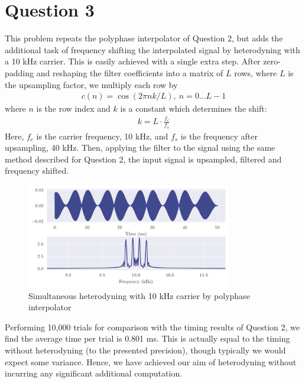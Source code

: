 \section*{Question 3}

This problem repeats the polyphase interpolator of Question 2, but adds the additional task of frequency shifting the interpolated signal by heterodyning with a 10 kHz carrier. This is easily achieved with a single extra step. After zero-padding and reshaping the filter coefficients into a matrix of $L$ rows, where $L$ is the upsampling factor, we multiply each row by
\begin{align}
    c(n) = \cos(2\pi nk/L),\ n = 0 \dots L-1
\end{align}
where $n$ is the row index and $k$ is a constant which determines the shift:
\begin{align}
    k = L \cdot \frac{f_c}{f_s}
\end{align}
Here, $f_c$ is the carrier frequency, 10 kHz, and $f_s$ is the frequency after upsampling, 40 kHz. Then, applying the filter to the signal using the same method described for Question 2, the input signal is upsampled, filtered and frequency shifted.

\begin{figure}[ht]
    \centering
    \includegraphics[width=0.8\textwidth]{images/q3_heterodyne.png}
    \caption{Simultaneous heterodyning with 10 kHz carrier by polyphase interpolator}
    \label{fig:q3_heterodyne}
\end{figure}

Performing 10,000 trials for comparison with the timing results of Question 2, we find the average time per trial is 0.801 ms. This is actually equal to the timing without heterodyning (to the presented precision), though typically we would expect some variance. Hence, we have achieved our aim of heterodyning without incurring any significant additional computation.
